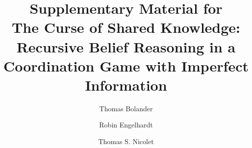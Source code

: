 \documentclass[a4paper,superscriptaddress,nofootinbib]{revtex4}
\begin{document}
\title{Supplementary Material for \\
The Curse of Shared Knowledge: Recursive Belief Reasoning in a Coordination Game with Imperfect Information}
\author{Thomas Bolander}
\author{Robin Engelhardt}
\author{Thomas S. Nicolet}

\maketitle

\end{document}
